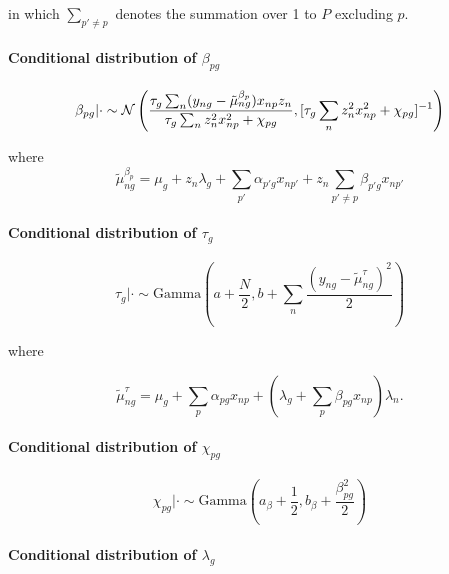 in which $\sum_{p' \neq p}$ denotes the summation over 1 to $P$ excluding $p$.

\paragraph{Conditional distribution of $\beta_{pg}$}

\begin{equation}
\beta_{pg} | \cdot \sim \mathcal{N} \left( \frac{
\tau_g \sum_n (y_{ng} - \tilde{\mu}_{ng}^{\beta_p})x_{np} z_n
}{\tau_g \sum_n z_n^2 x_{np}^2 + \chi_{pg}},
[\tau_g \sum_n z_n^2 x_{np}^2 + \chi_{pg}]^{-1} \right)
\end{equation}

where
\begin{equation}
\tilde{\mu}_{ng}^{\beta_p} = \mu_g + z_n \lambda_g  +
\sum_{p'} \alpha_{p'g} x_{np'} + z_n \sum_{p' \neq p} \beta_{p'g} x_{np'}
\end{equation}

\paragraph{Conditional distribution of $\tau_g$}

\begin{equation}
\tau_g | \cdot \sim \text{Gamma}\left(
a + \frac{N}{2}, b + \sum_n \frac{(y_{ng} - \tilde{\mu}^\tau_{ng})^2}{2}
\right)
\end{equation}

where

\begin{equation}
\tilde{\mu}^\tau_{ng} = \mu_g + \sum_p \alpha_{pg} x_{np} + \left( \lambda_g + \sum_p \beta_{pg} x_{np} \right) \lambda_n.
\end{equation}

\paragraph{Conditional distribution of $\chi_{pg}$}

\begin{equation}
\chi_{pg} | \cdot \sim \text{Gamma}\left( a_\beta + \frac{1}{2}, b_\beta + \frac{\beta_{pg}^2}{2}\right)
\end{equation}

\paragraph{Conditional distribution of $\lambda_g$}

